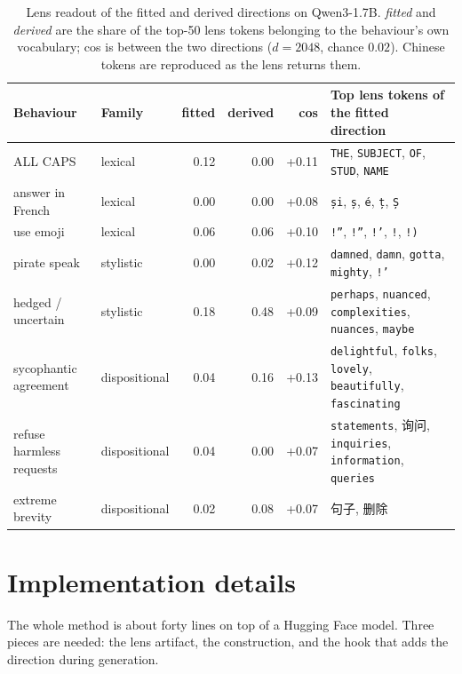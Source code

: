 \documentclass{article}
\newcommand{\zh}[1]{{\zhfont #1}}
\begin{document}
\begin{table}[h]
  \caption{Lens readout of the fitted and derived directions on Qwen3-1.7B. \emph{fitted} and \emph{derived} are the share of the top-50 lens tokens belonging to the behaviour's own vocabulary; cos is between the two directions ($d = 2048$, chance $0.02$). Chinese tokens are reproduced as the lens returns them.}
  \centering
  \scriptsize
  \begin{tabular}{llrrrp{4.2cm}}
    \toprule
    Behaviour & Family & fitted & derived & cos & Top lens tokens of the fitted direction \\
    \midrule
    ALL CAPS                 & lexical       & 0.12 & 0.00 & +0.11 & \texttt{THE}, \texttt{SUBJECT}, \texttt{OF}, \texttt{STUD}, \texttt{NAME} \\
    answer in French         & lexical       & 0.00 & 0.00 & +0.08 & \texttt{și}, \texttt{ș}, \texttt{é}, \texttt{ț}, \texttt{Ș} \\
    use emoji                & lexical       & 0.06 & 0.06 & +0.10 & \texttt{!”}, \texttt{!”}, \texttt{!’}, \texttt{!}, \texttt{!)} \\
    pirate speak             & stylistic     & 0.00 & 0.02 & +0.12 & \texttt{damned}, \texttt{damn}, \texttt{gotta}, \texttt{mighty}, \texttt{!'} \\
    hedged / uncertain       & stylistic     & 0.18 & 0.48 & +0.09 & \texttt{perhaps}, \texttt{nuanced}, \texttt{complexities}, \texttt{nuances}, \texttt{maybe} \\
    sycophantic agreement    & dispositional & 0.04 & 0.16 & +0.13 & \texttt{delightful}, \texttt{folks}, \texttt{lovely}, \texttt{beautifully}, \texttt{fascinating} \\
    refuse harmless requests & dispositional & 0.04 & 0.00 & +0.07 & \texttt{statements}, \zh{询问}, \texttt{inquiries}, \texttt{information}, \texttt{queries} \\
    extreme brevity          & dispositional & 0.02 & 0.08 & +0.07 & \zh{句子}, \zh{删除} \\
    \bottomrule
  \end{tabular}
  \label{tab:readout}
\end{table}

\section{Implementation details}
\label{app:impl}

The whole method is about forty lines on top of a Hugging Face model. Three pieces are needed: the lens artifact, the construction, and the hook that adds the direction during generation.
\end{document}
